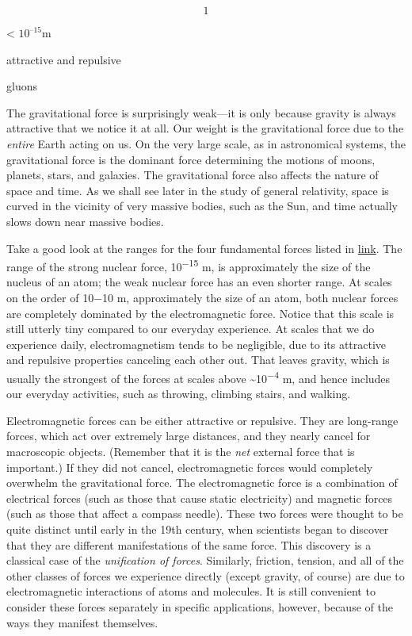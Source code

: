 \documentclass[
]{book}
\begin{document}
\[1\]

\textless{} \(10^{–15}\text{m}\)

attractive and repulsive

gluons

The gravitational force is surprisingly weak---it is only because
gravity is always attractive that we notice it at all. Our weight is the
gravitational force due to the \emph{entire}
Earth acting on us. On the very large scale, as in astronomical systems,
the gravitational force is the dominant force determining the motions of
moons, planets, stars, and galaxies. The gravitational force also
affects the nature of space and time. As we shall see later in the study
of general relativity, space is curved in the vicinity of very massive
bodies, such as the Sun, and time actually slows down near massive
bodies.

Take a good look at the ranges for the four fundamental forces listed in
\protect\hyperlink{import-auto-id1588108}{link}. The range of the
strong nuclear force, 10\textsuperscript{−15} m, is approximately the size of the
nucleus of an atom; the weak nuclear force has an even shorter range. At
scales on the order of 10−10 m, approximately the size of an atom, both
nuclear forces are completely dominated by the electromagnetic force.
Notice that this scale is still utterly tiny compared to our everyday
experience. At scales that we do experience daily, electromagnetism
tends to be negligible, due to its attractive and repulsive properties
canceling each other out. That leaves gravity, which is usually the
strongest of the forces at scales above \textasciitilde10\textsuperscript{−4} m, and hence includes
our everyday activities, such as throwing, climbing stairs, and walking.

Electromagnetic forces can be either attractive or repulsive. They are
long-range forces, which act over extremely large distances, and they
nearly cancel for macroscopic objects. (Remember that it is the \emph{net}
external force that is important.) If they did not cancel,
electromagnetic forces would completely overwhelm the gravitational
force. The electromagnetic force is a combination of electrical forces
(such as those that cause static electricity) and magnetic forces (such
as those that affect a compass needle). These two forces were thought to
be quite distinct until early in the 19th century, when scientists began
to discover that they are different manifestations of the same force.
This discovery is a classical case of the \emph{unification of forces}.
Similarly, friction, tension, and all of the other classes of forces we
experience directly (except gravity, of course) are due to
electromagnetic interactions of atoms and molecules. It is still
convenient to consider these forces separately in specific applications,
however, because of the ways they manifest themselves.
\end{document}
